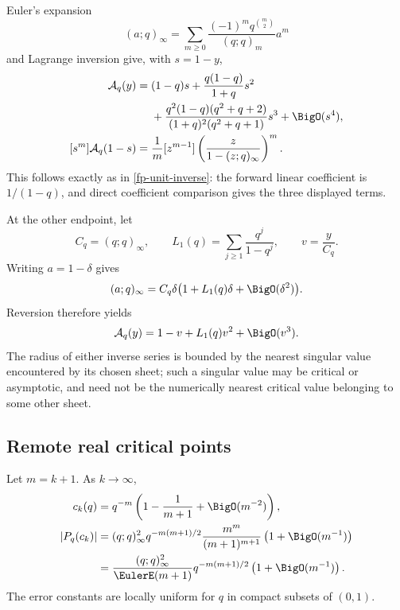 Euler's expansion
\[
 (a;q)_\infty=\sum_{m\geq0}
 \frac{(-1)^mq^{\binom m2}}{(q;q)_m}a^m
\]
and Lagrange inversion give, with \(s=1-y\),
\begin{align}
 \mathcal A_q(y)={}&(1-q)s+\frac{q(1-q)}{1+q}s^2 \notag\\
 &+\frac{q^2(1-q)(q^2+q+2)}
 {(1+q)^2(q^2+q+1)}s^3+\BigO(s^4),
 \label{eq:ip-unit-target-jet}\\
 [s^m]\mathcal A_q(1-s)
 ={}&\frac1m[z^{m-1}]
 \left(\frac{z}{1-(z;q)_\infty}\right)^m.
 \label{eq:ip-unit-target-all-order}
\end{align}
This follows exactly as in \cref{fp-unit-inverse}: the forward linear
coefficient is \(1/(1-q)\), and direct coefficient comparison gives the three
displayed terms.

At the other endpoint, let
\[
 C_q=(q;q)_\infty,\qquad
 L_1(q)=\sum_{j\geq1}\frac{q^j}{1-q^j},\qquad v=\frac y{C_q}.
\]
Writing \(a=1-\delta\) gives
\[
 (a;q)_\infty=C_q\delta\bigl(1+L_1(q)\delta+\BigO(\delta^2)\bigr).
\]
Reversion therefore yields
\begin{equation}
 \mathcal A_q(y)=1-v+L_1(q)v^2+\BigO(v^3).
 \label{eq:ip-zero-target-jet}
\end{equation}
The radius of either inverse series is bounded by the nearest singular value
encountered by its chosen sheet; such a singular value may be critical or
asymptotic, and need not be the numerically nearest critical value belonging
to some other sheet.

\subsection{Remote real critical points}

\begin{theorem}
\label{thm:ip-remote-gaps}
Let \(m=k+1\).  As \(k\to\infty\),
\begin{align}
 c_k(q)&=q^{-m}\left(1-\frac1{m+1}+\BigO(m^{-2})\right),
 \label{eq:ip-remote-location}\\
 |P_q(c_k)|
 &= (q;q)_\infty^2q^{-m(m+1)/2}
 \frac{m^m}{(m+1)^{m+1}}\left(1+\BigO(m^{-1})\right)
 \label{eq:ip-remote-value}\\
 &=\frac{(q;q)_\infty^2}{\EulerE(m+1)}
 q^{-m(m+1)/2}\left(1+\BigO(m^{-1})\right).
 \notag
\end{align}
The error constants are locally uniform for \(q\) in compact subsets of
\((0,1)\).
\end{theorem}

